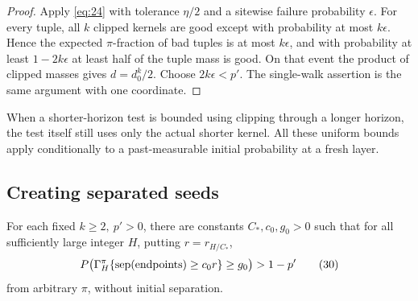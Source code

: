 \begin{proof}
Apply \eqref{eq:24} with tolerance \(\eta/2\) and a sitewise failure
probability \(\epsilon\). For every tuple, all \(k\) clipped kernels
are good except with probability at most \(k\epsilon\). Hence the
expected \(\pi\)-fraction of bad tuples is at most \(k\epsilon\), and
with probability at least \(1-2k\epsilon\) at least half of the tuple
mass is good. On that event the product of clipped masses gives
\(d=d_0^k/2\). Choose \(2k\epsilon<p'\). The single-walk assertion is
the same argument with one coordinate.
\end{proof}

When a shorter-horizon test is bounded using clipping through a longer
horizon, the test itself still uses only the actual shorter kernel.
All these uniform bounds apply conditionally to a past-measurable
initial probability at a fresh layer.

\subsection{Creating separated seeds}

\begin{proposition}\label{kernel-seeds}
For each fixed \(k\ge2,\ p'>0\), there are constants \(C_*,c_0,g_0>0\) such that for all sufficiently large integer \(H\), putting \(r=r_{H/C_*}\),
\[
P\big(\Gamma_H^\pi\{{\rm sep}(\text{endpoints})\ge c_0 r\}\ge g_0\big)>1-p'
\tag{30}\label{eq:30}
\]
from arbitrary \(\pi\), without initial separation.
\end{proposition}

